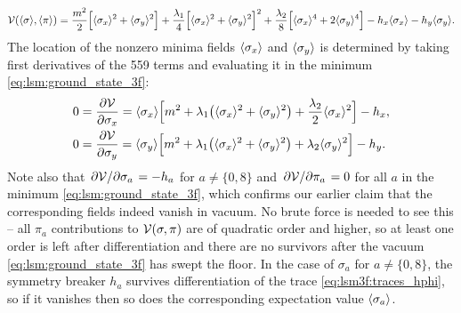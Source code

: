 \begin{equation}
	\mathcal{V}(\langle \sigma \rangle,\langle \pi \rangle) = \frac{m^2}{2} \Big[ \langle \sigma_x \rangle^2 + \langle \sigma_y \rangle^2 \Big] + \frac{\lambda_1}{4} \Big[ \langle \sigma_x \rangle^2 + \langle \sigma_y \rangle^2 \Big]^2 + \frac{\lambda_2}{8} \Big[ \langle \sigma_x \rangle^4 + 2 \langle \sigma_y \rangle^4 \Big] - h_x \langle \sigma_x \rangle - h_y \langle \sigma_y \rangle.
\label{eq:lsm:potential_tree_3f}
\end{equation}
The location of the nonzero minima fields $\langle \sigma_x \rangle$ and $\langle \sigma_y \rangle$ is determined
by taking first derivatives of the 559 terms and evaluating it in the minimum \eqref{eq:lsm:ground_state_3f}:
\begin{subequations}
\begin{align}
	0 &= \pdv{\mathcal{V}}{\sigma_x} = \langle \sigma_x \rangle \Big[ m^2 + \lambda_1 \big( \langle \sigma_x \rangle^2 + \langle \sigma_y \rangle^2 \big) + \frac{\lambda_2}{2} \langle \sigma_x \rangle^2 \Big] - h_x, \\
	0 &= \pdv{\mathcal{V}}{\sigma_y} = \langle \sigma_y \rangle \Big[ m^2 + \lambda_1 \big( \langle \sigma_x \rangle^2 + \langle \sigma_y \rangle^2 \big) + \lambda_2 \langle \sigma_y \rangle^2 \Big] - h_y.
\end{align}
\label{eq:lsm3f:symmetry_breakers}%
\end{subequations}
Note also that $\pdv{\mathcal{V}}/{\sigma_a} = -h_a$ for $a \neq \{0,8\}$ and $\pdv{\mathcal{V}}/{\pi_a}=0$ for all $a$ in the minimum \eqref{eq:lsm:ground_state_3f},
which confirms our earlier claim that the corresponding fields indeed vanish in vacuum.
No brute force is needed to see this --
all $\pi_a$ contributions to $\mathcal{V}(\sigma,\pi)$ are of quadratic order and higher,
so at least one order is left after differentiation and there are no survivors after the vacuum \eqref{eq:lsm:ground_state_3f} has swept the floor.
In the case of $\sigma_a$ for $a \neq \{0,8\}$, the symmetry breaker $h_a$ survives differentiation of the trace \eqref{eq:lsm3f:traces_hphi}, so if it vanishes then so does the corresponding expectation value $\langle \sigma_a \rangle$.

